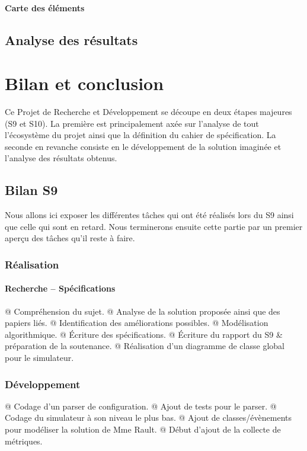 \documentclass[final]{polytech/polytech}
\begin{document}
			\subsubsection{Carte des éléments}
	
	\section{Analyse des résultats}
	
\chapter{Bilan et conclusion}
	Ce Projet de Recherche et Développement se découpe en deux étapes majeures (S9 et S10).
	La première est principalement axée sur l'analyse de tout l'écosystème du projet ainsi que la définition du cahier de spécification.
	La seconde en revanche consiste en le développement de la solution imaginée et l'analyse des résultats obtenus.
	
	\section{Bilan S9}
		Nous allons ici exposer les différentes tâches qui ont été réalisés lors du S9 ainsi que celle qui sont en retard.
		Nous terminerons ensuite cette partie par un premier aperçu des tâches qu'il reste à faire.
		
		\subsection{Réalisation}
			\subsubsection{Recherche -- Spécifications}
				\begin{easylist}[itemize]
					@ Compréhension du sujet.
					@ Analyse de la solution proposée ainsi que des papiers liés.
					@ Identification des améliorations possibles.
					@ Modélisation algorithmique.
					@ Écriture des spécifications.
					@ Écriture du rapport du S9 \& préparation de la soutenance.
					@ Réalisation d'un diagramme de classe global pour le simulateur.
				\end{easylist}

			\subsection{Développement}
				\begin{easylist}[itemize]
					@ Codage d'un parser de configuration.
					@ Ajout de tests pour le parser.
					@ Codage du simulateur à son niveau le plus bas.
					@ Ajout de classes/évènements pour modéliser la solution de Mme Rault.
					@ Début d'ajout de la collecte de métriques.
				\end{easylist}
\end{document}
